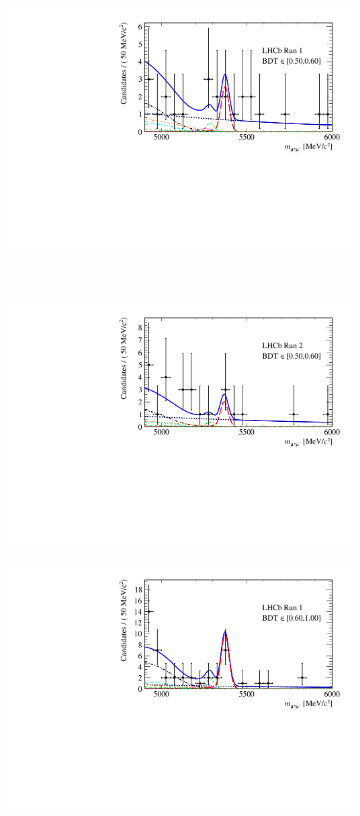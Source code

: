 {{\begin{figure}[htbp]
\begin{subfigure}[b]{0.48\textwidth}
        \includegraphics[width=\textwidth]{./Figs/BFAnalysis/Fig17c.pdf}
    \end{subfigure}
    ~ %
    \begin{subfigure}[b]{0.48\textwidth}
       \includegraphics[width=\textwidth]{./Figs/BFAnalysis/Fig17g.pdf}
    \end{subfigure}
    \begin{subfigure}[b]{0.48\textwidth}
        \includegraphics[width=\textwidth]{./Figs/BFAnalysis/Fig17d.pdf}

\end{subfigure}
\end{figure}}}
